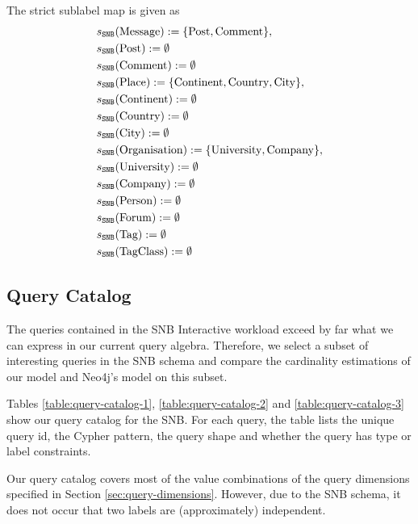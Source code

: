 The strict sublabel map is given as
\begin{align}
\begin{split}
  &s_{\texttt{SNB}}(\text{Message}) := \{ \text{Post}, \text{Comment} \}, \\
  &s_{\texttt{SNB}}(\text{Post}) := \emptyset \\
  &s_{\texttt{SNB}}(\text{Comment}) := \emptyset \\
  &s_{\texttt{SNB}}(\text{Place}) := \{ \text{Continent}, \text{Country},
                                    \text{City} \}, \\
  &s_{\texttt{SNB}}(\text{Continent}) := \emptyset \\
  &s_{\texttt{SNB}}(\text{Country}) := \emptyset \\
  &s_{\texttt{SNB}}(\text{City}) := \emptyset \\
  &s_{\texttt{SNB}}(\text{Organisation}) := \{ \text{University},
                                           \text{Company} \}, \\
  &s_{\texttt{SNB}}(\text{University}) := \emptyset \\
  &s_{\texttt{SNB}}(\text{Company}) := \emptyset \\
  &s_{\texttt{SNB}}(\text{Person}) := \emptyset \\
  &s_{\texttt{SNB}}(\text{Forum}) := \emptyset \\
  &s_{\texttt{SNB}}(\text{Tag}) := \emptyset \\
  &s_{\texttt{SNB}}(\text{TagClass}) := \emptyset
\end{split}
\end{align}

\subsection{Query Catalog}

The queries contained in the  SNB Interactive workload exceed by far what we
can express in our current query algebra.
Therefore, we select a subset of interesting queries in the SNB schema and
compare the cardinality estimations of our model and Neo4j's model on this
subset.

Tables \ref{table:query-catalog-1}, \ref{table:query-catalog-2} and
\ref{table:query-catalog-3}  show our query catalog for the SNB.
For each query, the table lists the unique query id, the Cypher pattern,
the query shape and whether the query has type or label constraints.

Our query catalog covers most of the value combinations of the query dimensions
specified in Section \ref{sec:query-dimensions}.
However, due to the SNB schema, it does not occur that two labels are
(approximately) independent.

